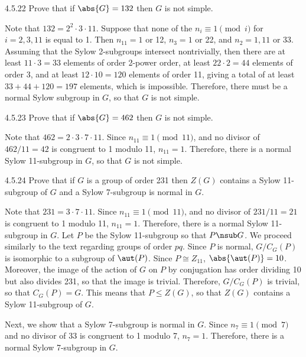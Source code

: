 \begin{exercise}{4.5.22}
	Prove that if $\abs{G} = 132$ then $G$ is not simple.
\end{exercise}

\begin{sol}
	Note that $132 = 2^2 \cdot 3 \cdot 11$.
	Suppose that none of the $n_i \equiv 1 \pmod i$ for $i = 2, 3, 11$ is equal to 1.
	Then $n_{11} = 1$ or 12, $n_3 = 1$ or 22, and $n_2 = 1, 11$ or 33.
	Assuming that the Sylow 2-subgroups intersect nontrivially, then there are at least $11 \cdot 3 = 33$ elements of order 2-power order, at least $22 \cdot 2 = 44$ elements of order 3, and at least $12 \cdot 10 = 120$ elements of order 11, giving a total of at least $33 + 44 + 120 = 197$ elements, which is impossible.
	Therefore, there must be a normal Sylow subgroup in $G$, so that $G$ is not simple.
\end{sol}

\begin{exercise}{4.5.23}
	Prove that if $\abs{G} = 462$ then $G$ is not simple.
\end{exercise}

\begin{sol}
	Note that $462 = 2 \cdot 3 \cdot 7 \cdot 11$.
	Since $n_{11} \equiv 1 \pmod 11$, and no divisor of $462/11 = 42$ is congruent to 1 modulo 11, $n_{11} = 1$.
	Therefore, there is a normal Sylow 11-subgroup in $G$, so that $G$ is not simple.
\end{sol}

\begin{exercise}{4.5.24}
	Prove that if $G$ is a group of order 231 then $Z(G)$ contains a Sylow 11-subgroup of $G$ and a Sylow 7-subgroup is normal in $G$.
\end{exercise}

\begin{sol}
	Note that $231 = 3 \cdot 7 \cdot 11$.
	Since $n_{11} \equiv 1 \pmod 11$, and no divisor of $231/11 = 21$ is congruent to 1 modulo 11, $n_{11} = 1$.
	Therefore, there is a normal Sylow 11-subgroup in $G$.
	Let $P$ be the Sylow 11-subgroup so that $P \nsub G$.
	We proceed similarly to the text regarding groups of order $pq$.
	Since $P$ is normal, $G/C_G(P)$ is isomorphic to a subgroup of $\aut(P)$.
	Since $P \cong Z_{11}$, $\abs{\aut(P)} = 10$.
	Moreover, the image of the action of $G$ on $P$ by conjugation has order dividing 10 but also divides 231, so that the image is trivial.
	Therefore, $G/C_G(P)$ is trivial, so that $C_G(P) = G$.
	This means that $P \leq Z(G)$, so that $Z(G)$ contains a Sylow 11-subgroup of $G$.

	Next, we show that a Sylow 7-subgroup is normal in $G$.
	Since $n_7 \equiv 1 \pmod 7$ and no divisor of 33 is congruent to 1 modulo 7, $n_7 = 1$.
	Therefore, there is a normal Sylow 7-subgroup in $G$.
\end{sol}

